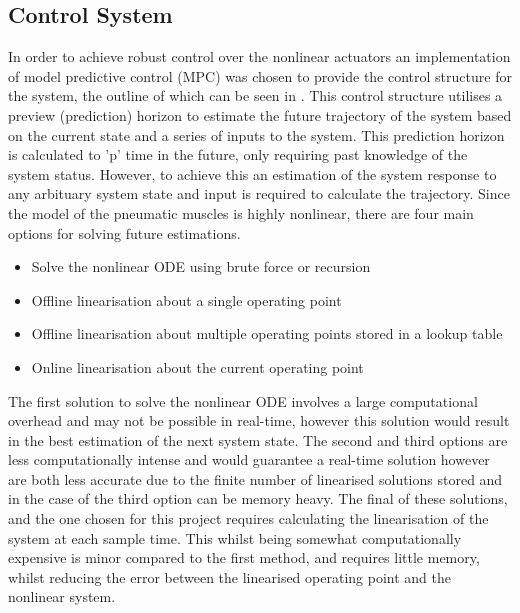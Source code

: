 \documentclass[11pt,a4paper]{article}
\begin{document}
\subsection{Control System}
\label{sub:control_system}
In order to achieve robust control over the nonlinear actuators an implementation of model predictive control (MPC) was chosen to provide the control structure for the system, the outline of which can be seen in . This control structure utilises a preview (prediction) horizon to estimate the future trajectory of the system based on the current state and a series of inputs to the system. This prediction horizon is calculated to 'p' time in the future, only requiring past knowledge of the system status. However, to achieve this an estimation of the system response to any arbituary system state and input is required to calculate the trajectory. Since the model of the pneumatic muscles is highly nonlinear, there are four main options for solving future estimations.
\begin{itemize}
    \item Solve the nonlinear ODE using brute force or recursion
    \item Offline linearisation about a single operating point
    \item Offline linearisation about multiple operating points stored in a lookup table
    \item Online linearisation about the current operating point
\end{itemize}

The first solution to solve the nonlinear ODE involves a large computational overhead and may not be possible in real-time, however this solution would result in the best estimation of the next system state. The second and third options are less computationally intense and would guarantee a real-time solution however are both less accurate due to the finite number of linearised solutions stored and in the case of the third option can be memory heavy. The final of these solutions, and the one chosen for this project requires calculating the linearisation of the system at each sample time. This whilst being somewhat computationally expensive is minor compared to the first method, and requires little memory, whilst reducing the error between the linearised operating point and the nonlinear system.\newline
\end{document}
